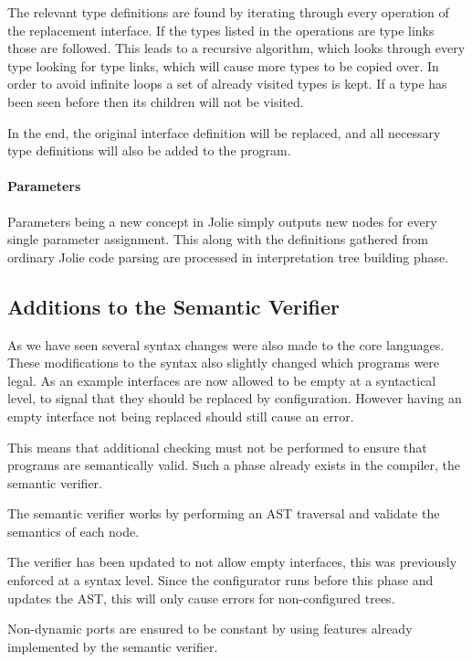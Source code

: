 The relevant type definitions are found by iterating through every operation of
the replacement interface. If the types listed in the operations are type links
those are followed. This leads to a recursive algorithm, which looks through
every type looking for type links, which will cause more types to be copied
over. In order to avoid infinite loops a set of already visited types is kept.
If a type has been seen before then its children will not be visited.

In the end, the original interface definition will be replaced, and all
necessary type definitions will also be added to the program.

\paragraph{Parameters}

Parameters being a new concept in Jolie simply outputs new nodes for every
single parameter assignment. This along with the definitions gathered from
ordinary Jolie code parsing are processed in interpretation tree building
phase.

\subsection{Additions to the Semantic Verifier}

As we have seen several syntax changes were also made to the core languages.
These modifications to the syntax also slightly changed which programs were
legal. As an example interfaces are now allowed to be empty at a syntactical
level, to signal that they should be replaced by configuration. However having
an empty interface not being replaced should still cause an error.

This means that additional checking must not be performed to ensure that
programs are semantically valid. Such a phase already exists in the compiler,
the semantic verifier.

The semantic verifier works by performing an AST traversal and validate the
semantics of each node.

The verifier has been updated to not allow empty interfaces, this was
previously enforced at a syntax level. Since the configurator runs before this
phase and updates the AST, this will only cause errors for non-configured
trees.

Non-dynamic ports are ensured to be constant by using features already
implemented by the semantic verifier.

